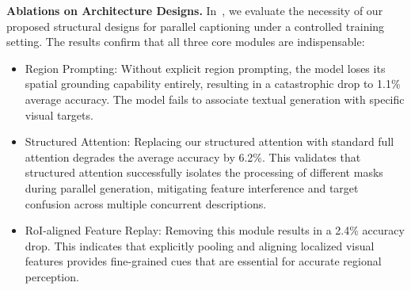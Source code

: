 \begin{table}[htbp]
\centering
\setlength{\belowcaptionskip}{8pt}
\caption{Ablations on core design choices for parallel captioning under the same training setting, including module design and attention masking strategy. Results show that \textit{region prompting}, \textit{RoI-aligned feature replay}, and \textit{structured attention} are all important for the final performance. Following the judge-scoring protocol, Pos/Neg scores can be slightly negative when penalties dominate.}
\label{tab:component_ablation}
\setlength{\tabcolsep}{6pt}
\renewcommand{\arraystretch}{1.15}
\end{table}

\noindent
\textbf{Ablations on Architecture Designs.}
In~, we evaluate the necessity of our proposed structural designs for parallel captioning under a controlled training setting. The results confirm that all three core modules are indispensable:
\begin{itemize}
    \item Region Prompting: Without explicit region prompting, the model loses its spatial grounding capability entirely, resulting in a catastrophic drop to 1.1\% average accuracy. The model fails to associate textual generation with specific visual targets.
    \item Structured Attention: Replacing our structured attention with standard full attention degrades the average accuracy by 6.2\%. This validates that structured attention successfully isolates the processing of different masks during parallel generation, mitigating feature interference and target confusion across multiple concurrent descriptions.
    \item RoI-aligned Feature Replay: Removing this module results in a 2.4\% accuracy drop. This indicates that explicitly pooling and aligning localized visual features provides fine-grained cues that are essential for accurate regional perception.
\end{itemize}


